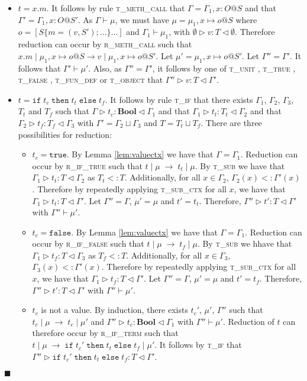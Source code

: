\documentclass{article}
\newcommand{\lemref}[1]{Lemma \ref{#1}}
\newcommand{\rmethc}{\textsc{r\_meth\_call} }
\newcommand{\rifexpr}{\textsc{r\_if\_term} }
\newcommand{\riftrue}{\textsc{r\_if\_true} }
\newcommand{\riffalse}{\textsc{r\_if\_false} }
\newcommand{\tunit}{\textsc{t\_unit} }
\newcommand{\ttrue}{\textsc{t\_true} }
\newcommand{\tfalse}{\textsc{t\_false} }
\newcommand{\tobj}{\textsc{t\_object} }
\newcommand{\tfundef}{\textsc{t\_fun\_def} }
\newcommand{\tif}{\textsc{t\_if} }
\newcommand{\tmethc}{\textsc{t\_meth\_call} }
\newcommand{\tsub}{\textsc{t\_sub} }
\newcommand{\tsubctx}{\textsc{t\_sub\_ctx} }
\newcommand{\typerule}[4]{#1 \triangleright #2 : #3 \triangleleft #4}
\newcommand{\oprule}[4]{#1 \mid #2\;\longrightarrow\;#3 \mid #4}
\newcommand{\truev}{\mathtt{true}}
\newcommand{\falsev}{\mathtt{false}}
\newcommand{\boolt}{\mathbf{Bool}}
\newcommand{\ift}[3]{\mathtt{if} \; #1 \; \mathtt{then} \; #2 \; \mathtt{else} \; #3}
\newcommand{\qed}{$\blacksquare$}
\newenvironment{proof}{\vspace{1ex}\noindent{\bf Proof}\hspace{0.5em}}
  {\hfill\qed\vspace{1ex}}
\begin{document}
\begin{proof}
\begin{itemize}
\item $t = x.m$. It follows by rule \tmethc that
$\Gamma = \Gamma_1, x : O@S$ and that $\Gamma' = \Gamma_1, x : O@S'$. As
$\Gamma \vdash \mu$, we must have $\mu = \mu_1, x \mapsto o@S$ where
$o = [ S \{ m = (v,S') ; ... \} ... ]$ and
$\Gamma_1 \vdash \mu_1$, with 
$\typerule{\emptyset}{v}{T}{\emptyset}$.
Therefore reduction can occur by \rmethc such that
$x.m \mid \mu_1, x \mapsto o@S \longrightarrow v \mid \mu_1, x \mapsto o@S'$.
Let $\mu' = \mu_1, x \mapsto o@S'$. Let $\Gamma'' = \Gamma'$. It follows that
$\Gamma' \vdash \mu'$. Also, as $\Gamma'' = \Gamma'$, it follows by
one of \tunit, \ttrue, \tfalse, \tfundef or \tobj that 
$\typerule{\Gamma''}{v}{T}{\Gamma'}$.

\item $t = \ift{t_c}{t_t}{t_f}$. It follows by rule \tif that there exists
$\Gamma_1$, $\Gamma_2$, $\Gamma_3$, $T_t$ and $T_f$ such that
$\typerule{\Gamma}{t_c}{\boolt}{\Gamma_1}$ and that
$\typerule{\Gamma_1}{t_t}{T_t}{\Gamma_2}$ and that
$\typerule{\Gamma_2}{t_f}{T_f}{\Gamma_3}$ with
$\Gamma' = \Gamma_2 \sqcup \Gamma_3$ and $T = T_t \sqcup T_f$. There are
three possibilities for reduction:

	\begin{itemize}
	\item $t_c = \truev$. By \lemref{lem:valuectx} we have that
	$\Gamma = \Gamma_1$. Reduction can occur by \riftrue such that
	$\oprule{t}{\mu}{t_t}{\mu}$. By \tsub we have that
	$\typerule{\Gamma_1}{t_t}{T}{\Gamma_2}$ as $T_t <: T$. Additionally, for
	all $x \in \Gamma_2$, $\Gamma_2(x) <: \Gamma'(x)$. Therefore by
	repeatedly applying \tsubctx for all $x$, we have that
	$\typerule{\Gamma_1}{t_t}{T}{\Gamma'}$.
	Let $\Gamma'' = \Gamma$, $\mu' = \mu$ and 
	$t' = t_t$. Therefore, $\typerule{\Gamma''}{t'}{T}{\Gamma'}$ with
	$\Gamma'' \vdash \mu'$.

	\item $t_c = \falsev$. By \lemref{lem:valuectx} we have that
	$\Gamma = \Gamma_1$. Reduction can occur by \riffalse such that
	$\oprule{t}{\mu}{t_f}{\mu}$. By \tsub we hhave that
	$\typerule{\Gamma_1}{t_f}{T}{\Gamma_3}$ as $T_f <: T$. Additionally, for
	all $x \in \Gamma_3$, $\Gamma_3(x) <: \Gamma'(x)$. Therefore by
	repeatedly applying \tsubctx for all $x$, we have that
	$\typerule{\Gamma_1}{t_f}{T}{\Gamma'}$. Let $\Gamma'' = \Gamma$,
	$\mu' = \mu$ and $t' = t_f$. Therefore, 
	$\typerule{\Gamma''}{t'}{T}{\Gamma'}$ with $\Gamma'' \vdash \mu'$.

	\item $t_c$ is not a value. By induction, there exists $t_c'$,
	$\mu'$, $\Gamma''$ such that 
	$\oprule{t_c}{\mu}{t_c}{\mu'}$ and 
	$\typerule{\Gamma''}{t_c}{\boolt}{\Gamma_1}$ with $\Gamma'' \vdash \mu'$. 
	Reduction of $t$ can therefore occur by \rifexpr such that
	$\oprule{t}{\mu}{\ift{t_c'}{t_t}{t_f}}{\mu'}$. It follows
	by \tif that $\typerule{\Gamma''}{\ift{t_c'}{t_t}{t_f}}{T}{\Gamma'}$.
	\end{itemize}

\end{itemize}
\end{proof}
\end{document}
